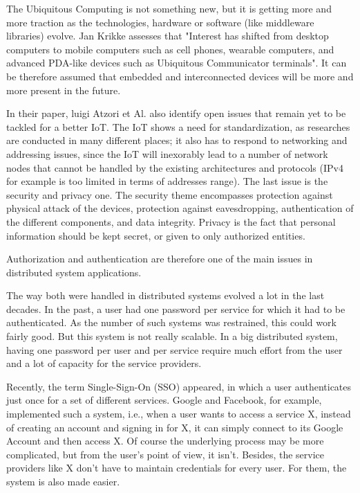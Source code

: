 The Ubiquitous Computing is not something new, but it is getting more and more traction as the technologies, hardware or software (like middleware libraries) evolve. Jan Krikke assesses that "Interest has shifted from desktop computers to mobile computers such as cell phones, wearable computers, and advanced PDA-like devices such as Ubiquitous Communicator terminals"\cite{Krikke2005}. It can be therefore assumed that embedded and interconnected devices will be more and more present in the future.

In their paper, luigi Atzori et Al. also identify open issues that remain yet to be tackled for a better IoT. The IoT shows a need for standardization, as researches are conducted in many different places; it also has to respond to networking and addressing issues, since the IoT will inexorably lead to a number of network nodes that cannot be handled by the existing architectures and protocols (IPv4 for example is too limited in terms of addresses range). The last issue is the security and privacy one. The security theme encompasses protection against physical attack of the devices,  protection against eavesdropping, authentication of the different components, and data integrity. Privacy is the fact that personal information should be kept secret, or given to only authorized entities. 

Authorization and authentication are therefore one of the main issues in distributed system applications. 

The way both were handled in distributed systems evolved a lot in the last decades. In the past, a user had one password per service for which it had to be authenticated. As the number of such systems was restrained, this could work fairly good. But this system is not really scalable. In a big distributed system, having one password per user and per service require much effort from the user and a lot of capacity for the service providers. 

Recently, the term Single-Sign-On (SSO) appeared, in which a user authenticates just once for a set of different services. Google and Facebook, for example, implemented such a system, i.e., when a user wants to access a service X, instead of creating an account and signing in for X, it can simply connect to its Google Account and then access X. Of course the underlying process may be more complicated, but from the user's point of view, it isn't. Besides, the service providers like X don't have to maintain credentials for every user. For them, the system is also made easier.

